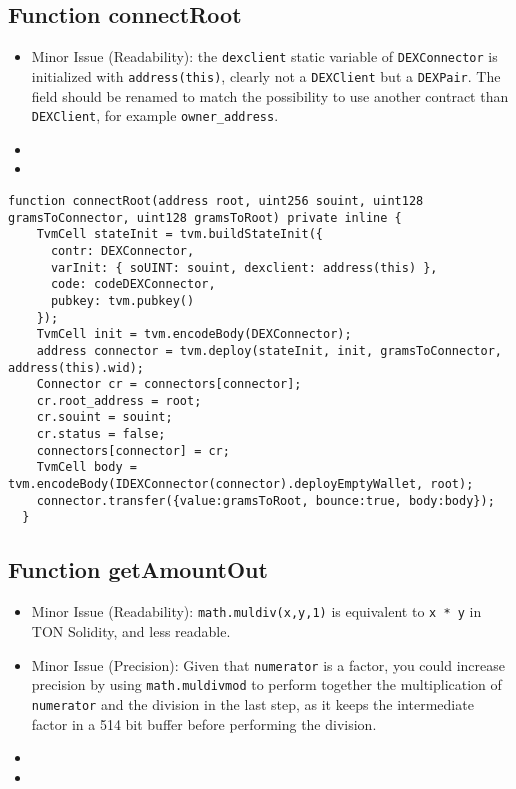 \subsection{Function connectRoot}

\begin{itemize}
\item Minor Issue (Readability): the {\tt dexclient} static variable
  of {\tt DEXConnector} is initialized with {\tt address(this)},
  clearly not a {\tt DEXClient} but a {\tt DEXPair}. The field should
  be renamed to match the possibility to use another contract than
  {\tt DEXClient}, for example {\tt owner\_address}.
\item \issueEncodeBody
\item \issueInternal
\end{itemize}

\begin{lstlisting}[firstnumber=113]
  function connectRoot(address root, uint256 souint, uint128 gramsToConnector, uint128 gramsToRoot) private inline {
    TvmCell stateInit = tvm.buildStateInit({
      contr: DEXConnector,
      varInit: { soUINT: souint, dexclient: address(this) },
      code: codeDEXConnector,
      pubkey: tvm.pubkey()
    });
    TvmCell init = tvm.encodeBody(DEXConnector);
    address connector = tvm.deploy(stateInit, init, gramsToConnector, address(this).wid);
    Connector cr = connectors[connector];
    cr.root_address = root;
    cr.souint = souint;
    cr.status = false;
    connectors[connector] = cr;
    TvmCell body = tvm.encodeBody(IDEXConnector(connector).deployEmptyWallet, root);
    connector.transfer({value:gramsToRoot, bounce:true, body:body});
  }
\end{lstlisting}

\subsection{Function getAmountOut}

\begin{itemize}
\item Minor Issue (Readability): {\tt math.muldiv(x,y,1)} is
  equivalent to {\tt x * y} in TON Solidity, and less readable.
\item Minor Issue (Precision): Given that {\tt numerator} is a factor,
  you could increase precision by using {\tt math.muldivmod} to
  perform together the multiplication of {\tt numerator} and the
  division in the last step, as it keeps the intermediate factor in a
  514 bit buffer before performing the division.
\item \issueError{}
\item \issueInternal{}
\end{itemize}

